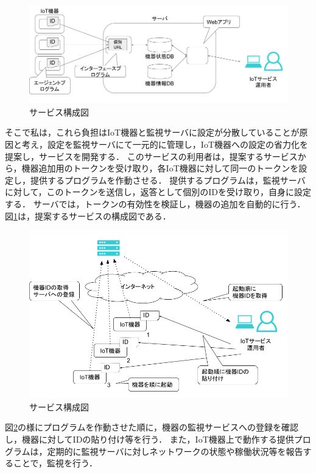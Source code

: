 \begin{figure}[htbp]
\includegraphics[width=16cm]{images/prop_diag.png}
\caption{サービス構成図}
\label{fig:prop_diag}
\end{figure}
そこで私は，これら負担はIoT機器と監視サーバに設定が分散していることが原因と考え，設定を監視サーバにて一元的に管理し，IoT機器への設定の省力化を提案し，サービスを開発する．
このサービスの利用者は，提案するサービスから，機器追加用のトークンを受け取り，各IoT機器に対して同一のトークンを設定し，提供するプログラムを作動させる．
提供するプログラムは，監視サーバに対して，このトークンを送信し，返答として個別のIDを受け取り，自身に設定する．
サーバでは，トークンの有効性を検証し，機器の追加を自動的に行う．
図\ref{fig:prop_diag}は，提案するサービスの構成図である．
\newpage

\begin{figure}[htbp]
\includegraphics[width=16cm]{images/prop_diag2.png}
\caption{サービス構成図}
\label{fig:prop_diag2}
\end{figure}
図\ref{fig:prop_diag2}の様にプログラムを作動させた順に，機器の監視サービスへの登録を確認し，機器に対してIDの貼り付け等を行う．
また，IoT機器上で動作する提供プログラムは，定期的に監視サーバに対しネットワークの状態や稼働状況等を報告することで，監視を行う．

